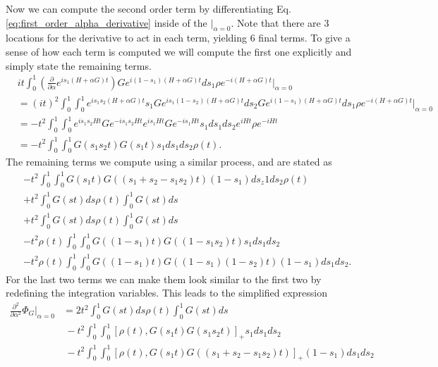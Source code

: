 \documentclass{article}
\newcommand{\parens}[1]{\left( #1 \right)}
\newcommand{\brackets}[1]{\left[ #1 \right]}
\begin{document}
Now we can compute the second order term by differentiating Eq. \eqref{eq:first_order_alpha_derivative} inside of the $\big|_{\alpha = 0}$. Note that there are 3 locations for the derivative to act in each term, yielding 6 final terms. To give a sense of how each term is computed we will compute the first one explicitly and simply state the remaining terms.
\begin{align}
    &i t\int_0^1 \parens{\frac{\partial}{\partial \alpha} e^{i s_1 (H+ \alpha G)t}} G e^{i(1-s_1)(H+\alpha G)t} ds_1 \rho e^{-i (H+\alpha G)t} \bigg|_{\alpha=0} \\
    &= (it)^2 \int_0^1 \int_0^1 e^{i s_1 s_2 (H+\alpha G)t} s_1 G e^{i s_1 (1-s_2) (H+\alpha G)t} ds_2 G e^{i(1-s_1) (H+\alpha G)t} ds_1 \rho e^{-i(H+\alpha G) t} \bigg|_{\alpha=0} \\
    &= -t^2 \int_0^1 \int_0^1 e^{i s_1 s_2 H t} G e^{-i s_1 s_2 H t} e^{i s_1 H t} G e^{-i s_1 H t} s_1 ds_1 ds_2 e^{i H t} \rho e^{-i H t} \\
    &= -t^2 \int_0^1 \int_0^1 G(s_1 s_2 t) G(s_1 t) s_1 ds_1 ds_2 \rho(t).
\end{align}
The remaining terms we compute using a similar process, and are stated as
\begin{align}
    & -t^2 \int_0^1 \int_0^1 G(s_1 t) G((s_1 + s_2 - s_1 s_2) t) (1-s_1) ds_z1 ds_2 \rho (t) \\
    & +t^2 \int_0^1 G(st) ds \rho(t) \int_0^1 G(st) ds \\
    & +t^2 \int_0^1 G(st) ds \rho(t) \int_0^1 G(st) ds \\
    & -t^2 \rho(t) \int_0^1 \int_0^1 G((1-s_1)t) G((1-s_1 s_2) t) s_1 ds_1 ds_2 \\
    & -t^2 \rho(t) \int_0^1 \int_0^1 G((1-s_1)t) G((1-s_1)(1 - s_2) t) (1-s_1) ds_1 ds_2.
\end{align}
For the last two terms we can make them look similar to the first two by redefining the integration variables. This leads to the simplified expression
\begin{align}
    \frac{\partial^2}{\partial \alpha^2} \Phi_G \bigg|_{\alpha = 0} &= 2 t^2 \int_0^1 G(st) ds \rho(t) \int_0^1 G(st) ds \label{eq:second_order_duhamel_one} \\
    &~ - t^2 \int_0^1 \int_0^1 \brackets{\rho(t) , G(s_1 t) G(s_1 s_2 t)}_+ s_1 ds_1 ds_2 \label{eq:second_order_duhamel_two}\\
    &~ - t^2 \int_0^1 \int_0^1 \brackets{ \rho(t), G(s_1 t) G((s_1 + s_2 - s_1 s_2) t) }_+ (1-s_1) ds_1 ds_2 \label{eq:second_order_duhamel_three}
\end{align}
\end{document}
